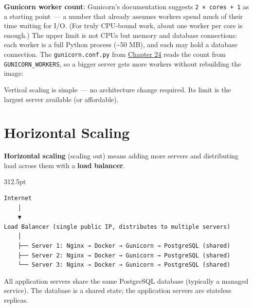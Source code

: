\noindent{}\textbf{Gunicorn worker count}: Gunicorn's documentation suggests \texttt{2\ ×\ cores\ +\ 1} as a starting point~--- a number that already assumes workers spend much of their time waiting for I/O. (For truly CPU-bound work, about one worker per core is enough.) The upper limit is not CPUs but memory and database connections: each worker is a full Python process (\textasciitilde50 MB), and each may hold a database connection. The \texttt{gunicorn.conf.py} from \hyperref[ch:24-process-startup]{Chapter 24} reads the count from \texttt{GUNICORN\_WORKERS}, so a bigger server gets more workers without rebuilding the image:

\begin{codebox}[short]

\begin{Shaded}
\begin{Highlighting}[]
\end{Highlighting}
\end{Shaded}

\end{codebox}

\noindent{}Vertical scaling is simple~--- no architecture change required. Its limit is the largest server available (or affordable).

\setcounter{section}{3}
\section{Horizontal Scaling}\label{36-scaling-load:364-horizontal-scaling}

\textbf{Horizontal scaling} (scaling out) means adding more servers and distributing load across them with a \textbf{load balancer}.

\begin{diagrambox}[short]{312.5pt}
\begin{Verbatim}[fontsize=\fontsize{9.0}{8.55}\selectfont]
Internet
    │
    ▼
Load Balancer (single public IP, distributes to multiple servers)
    │
    ├── Server 1: Nginx → Docker → Gunicorn → PostgreSQL (shared)
    ├── Server 2: Nginx → Docker → Gunicorn → PostgreSQL (shared)
    └── Server 3: Nginx → Docker → Gunicorn → PostgreSQL (shared)
\end{Verbatim}
\end{diagrambox}

\noindent{}All application servers share the same PostgreSQL database (typically a managed service). The database is a shared state; the application servers are stateless replicas.

